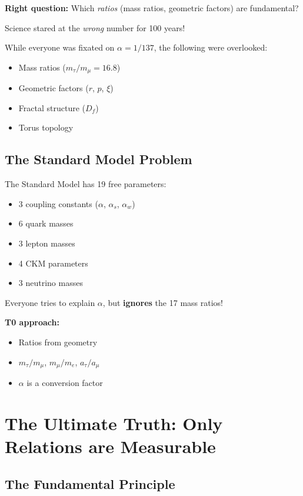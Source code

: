\textbf{Right question:} Which \textit{ratios} (mass ratios, geometric factors) are fundamental?

\begin{important}
	Science stared at the \textit{wrong} number for 100 years!
	
	While everyone was fixated on $\alpha = 1/137$, the following were overlooked:
	\begin{itemize}[nosep]
		\item Mass ratios ($m_\tau/m_\mu = 16.8$)
		\item Geometric factors ($r$, $p$, $\xi$)
		\item Fractal structure ($D_f$)
		\item Torus topology
	\end{itemize}
\end{important}

\subsection{The Standard Model Problem}

The Standard Model has 19 free parameters:
\begin{itemize}[nosep]
	\item 3 coupling constants ($\alpha$, $\alpha_s$, $\alpha_w$)
	\item 6 quark masses
	\item 3 lepton masses
	\item 4 CKM parameters
	\item 3 neutrino masses
\end{itemize}

Everyone tries to explain $\alpha$, but \textbf{ignores} the 17 mass ratios!

\textbf{T0 approach:}
\begin{itemize}[nosep]
	\item Ratios from geometry
	\item $m_\tau/m_\mu$, $m_\mu/m_e$, $a_\tau/a_\mu$
	\item $\alpha$ is a conversion factor
\end{itemize}

\section{The Ultimate Truth: Only Relations are Measurable}

\subsection{The Fundamental Principle}

